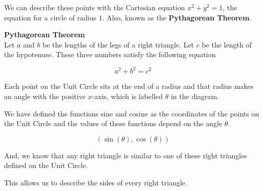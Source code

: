 \documentclass{ximera}
\begin{document}
We can describe these points with the Cartesian equation $x^2 + y^2 = 1$, the equation for a circle of radius $1$. Also, known as the \textbf{Pythagorean Theorem}.\\



\begin{theorem}   \textbf{\textcolor{green!50!black}{Pythagorean Theorem}} \\

Let $a$ and $b$ be the lengths of the legs of a right triangle. Let $c$ be the length of the hypotenuse. These three numbers satisfy the following equation

\[
a^2 + b^2 = c^2
\]

\end{theorem}




Each point on the Unit Circle sits at the end of a radius and that radius makes an angle with the positive $x$-axis, which is labelled $\theta$ in the diagram.




We have defined the functions sine and cosine as the coordinates of the points on the Unit Circle and the values of these functions depend on the angle $\theta$.

\[    ( \sin(\theta), \cos(\theta) ) \]




And, we know that any right triangle is similar to one of these right triangles defined on the Unit Circle.


This allows us to describe the sides of every right triangle.
\end{document}
